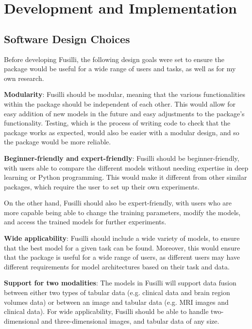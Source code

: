 \section{Development and Implementation}

\subsection{Software Design Choices}

Before developing Fusilli, the following design goals were set to ensure the package would be useful for a wide range of users and tasks, as well as for my own research.
\vspace{0.3cm}

\noindent\textbf{Modularity}: Fusilli should be modular, meaning that the various functionalities within the package should be independent of each other.
This would allow for easy addition of new models in the future and easy adjustments to the package's functionality.
Testing, which is the process of writing code to check that the package works as expected, would also be easier with a modular design, and so the package would be more reliable.

\vspace{0.3cm}

\noindent\textbf{Beginner-friendly and expert-friendly}:  Fusilli should be beginner-friendly, with users able to compare the different models without needing expertise in deep learning or Python programming.
This would make it different from other similar packages, which require the user to set up their own experiments.

On the other hand, Fusilli should also be expert-friendly, with users who are more capable being able to change the training parameters, modify the models, and access the trained models for further experiments.

\vspace{0.3cm}

\noindent\textbf{Wide applicability}:
Fusilli should include a wide variety of models, to ensure that the best model for a given task can be found.
Moreover, this would ensure that the package is useful for a wide range of users, as different users may have different requirements for model architectures based on their task and data.

\vspace{0.3cm}

\noindent\textbf{Support for two modalities}: The models in Fusilli will support data fusion between either two types of tabular data (e.g. clinical data and brain region volumes data) or between an image and tabular data (e.g. MRI images and clinical data).
For wide applicability, Fusilli should be able to handle two-dimensional and three-dimensional images, and tabular data of any size.

